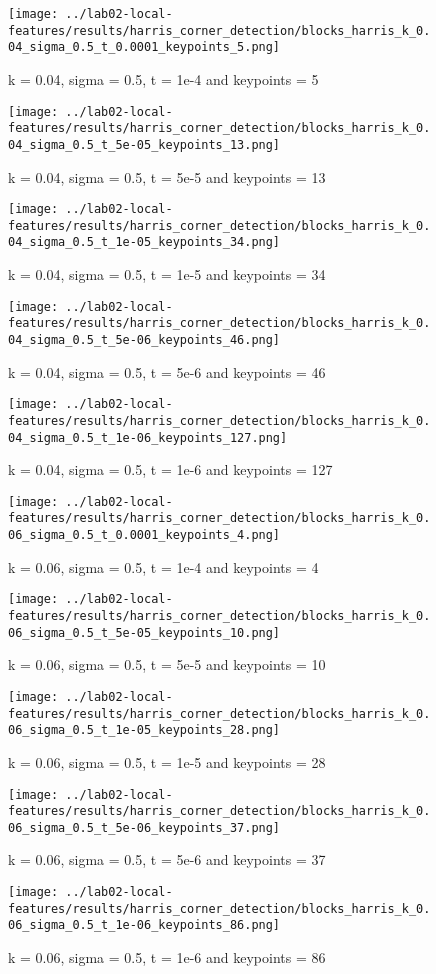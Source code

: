 \documentclass{ETHExercise}
\begin{document}
\begin{figure}[!htb]
  \texttt{[image: ../lab02-local-features/results/harris\_corner\_detection/blocks\_harris\_k\_0.04\_sigma\_0.5\_t\_0.0001\_keypoints\_5.png]}
  \caption{k = 0.04, sigma = 0.5, t = 1e-4 and keypoints = 5}
\endminipage\hfill
{}
  \texttt{[image: ../lab02-local-features/results/harris\_corner\_detection/blocks\_harris\_k\_0.04\_sigma\_0.5\_t\_5e-05\_keypoints\_13.png]}
  \caption{k = 0.04, sigma = 0.5, t = 5e-5 and keypoints = 13}
\endminipage\hfill
{}%
  \texttt{[image: ../lab02-local-features/results/harris\_corner\_detection/blocks\_harris\_k\_0.04\_sigma\_0.5\_t\_1e-05\_keypoints\_34.png]}
  \caption{k = 0.04, sigma = 0.5, t = 1e-5 and keypoints = 34}
\endminipage\hfill
{}%
  \texttt{[image: ../lab02-local-features/results/harris\_corner\_detection/blocks\_harris\_k\_0.04\_sigma\_0.5\_t\_5e-06\_keypoints\_46.png]}
  \caption{k = 0.04, sigma = 0.5, t = 5e-6 and keypoints = 46}
\endminipage\space\space\space 
{}%
  \texttt{[image: ../lab02-local-features/results/harris\_corner\_detection/blocks\_harris\_k\_0.04\_sigma\_0.5\_t\_1e-06\_keypoints\_127.png]}
  \caption{k = 0.04, sigma = 0.5, t = 1e-6 and keypoints = 127}
\endminipage
\end{figure}
\begin{figure}
    \texttt{[image: ../lab02-local-features/results/harris\_corner\_detection/blocks\_harris\_k\_0.06\_sigma\_0.5\_t\_0.0001\_keypoints\_4.png]}
    \caption{k = 0.06, sigma = 0.5, t = 1e-4 and keypoints = 4}
  \endminipage\hfill
    \texttt{[image: ../lab02-local-features/results/harris\_corner\_detection/blocks\_harris\_k\_0.06\_sigma\_0.5\_t\_5e-05\_keypoints\_10.png]}
    \caption{k = 0.06, sigma = 0.5, t = 5e-5 and keypoints = 10}
  \endminipage\hfill
    \texttt{[image: ../lab02-local-features/results/harris\_corner\_detection/blocks\_harris\_k\_0.06\_sigma\_0.5\_t\_1e-05\_keypoints\_28.png]}
    \caption{k = 0.06, sigma = 0.5, t = 1e-5 and keypoints = 28}
  \endminipage\hfill
    \texttt{[image: ../lab02-local-features/results/harris\_corner\_detection/blocks\_harris\_k\_0.06\_sigma\_0.5\_t\_5e-06\_keypoints\_37.png]}
    \caption{k = 0.06, sigma = 0.5, t = 5e-6 and keypoints = 37}
  \endminipage\space\space\space 
    \texttt{[image: ../lab02-local-features/results/harris\_corner\_detection/blocks\_harris\_k\_0.06\_sigma\_0.5\_t\_1e-06\_keypoints\_86.png]}
    \caption{k = 0.06, sigma = 0.5, t = 1e-6 and keypoints = 86}
  \endminipage
\end{figure}
\end{document}
